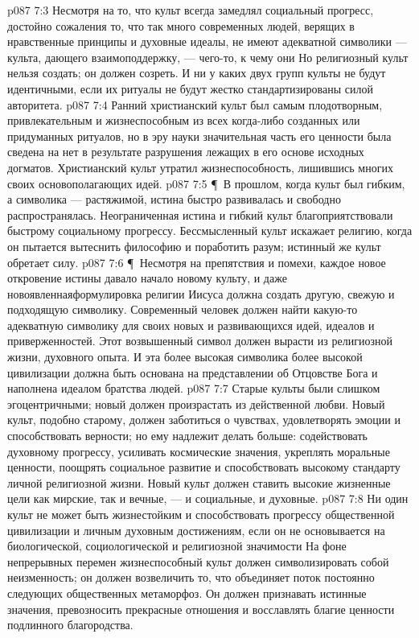 \vs p087 7:3 Несмотря на то, что культ всегда замедлял социальный прогресс, достойно сожаления то, что так много современных людей, верящих в нравственные принципы и духовные идеалы, не имеют адекватной символики --- культа, дающего взаимоподдержку, --- чего\hyp{}то, к чему они  Но религиозный культ нельзя создать; он должен созреть. И ни у каких двух групп культы не будут идентичными, если их ритуалы не будут жестко стандартизированы силой авторитета.
\vs p087 7:4 Ранний христианский культ был самым плодотворным, привлекательным и жизнеспособным из всех когда\hyp{}либо созданных или придуманных ритуалов, но в эру науки значительная часть его ценности была сведена на нет в результате разрушения лежащих в его основе исходных догматов. Христианский культ утратил жизнеспособность, лишившись многих своих основополагающих идей.
\vs p087 7:5 \P\ В прошлом, когда культ был гибким, а символика --- растяжимой, истина быстро развивалась и свободно распространялась. Неограниченная истина и гибкий культ благоприятствовали быстрому социальному прогрессу. Бессмысленный культ искажает религию, когда он пытается вытеснить философию и поработить разум; истинный же культ обретает силу.
\vs p087 7:6 \P\ Несмотря на препятствия и помехи, каждое новое откровение истины давало начало новому культу, и даже новоявленнаяформулировка религии Иисуса должна создать другую, свежую и подходящую символику. Современный человек должен найти какую\hyp{}то адекватную символику для своих новых и развивающихся идей, идеалов и приверженностей. Этот возвышенный символ должен вырасти из религиозной жизни, духовного опыта. И эта более высокая символика более высокой цивилизации должна быть основана на представлении об Отцовстве Бога и наполнена идеалом братства людей.
\vs p087 7:7 Старые культы были слишком эгоцентричными; новый должен произрастать из действенной любви. Новый культ, подобно старому, должен заботиться о чувствах, удовлетворять эмоции и способствовать верности; но ему надлежит делать больше: содействовать духовному прогрессу, усиливать космические значения, укреплять моральные ценности, поощрять социальное развитие и способствовать высокому стандарту личной религиозной жизни. Новый культ должен ставить высокие жизненные цели как мирские, так и вечные, --- и социальные, и духовные.
\vs p087 7:8 Ни один культ не может быть жизнестойким и способствовать прогрессу общественной цивилизации и личным духовным достижениям, если он не основывается на биологической, социологической и религиозной значимости  На фоне непрерывных перемен жизнеспособный культ должен символизировать собой неизменность; он должен возвеличить то, что объединяет поток постоянно следующих общественных метаморфоз. Он должен признавать истинные значения, превозносить прекрасные отношения и восславлять благие ценности подлинного благородства.
